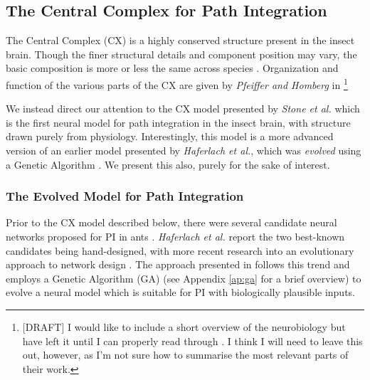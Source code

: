\documentclass[a4paper,11pt,twoside,openright]{article}
\begin{document}
\subsection{ The Central Complex for Path Integration } \label{CXBackground}
The Central Complex (CX) is a highly conserved structure present in the insect
brain\cite{Pfeiffer2014, Stone2017}. Though the finer structural details and
component position may vary, the basic composition is more or less the same
across species \cite{Pfeiffer2014}. Organization and function of the
various parts of the CX are given by \textit{Pfeiffer and Homberg} in
\cite{Pfeiffer2014}\footnote{[DRAFT] I would like to include a short overview
  of the neurobiology but have left it until I can properly read through
  \cite{Pfeiffer2014}. I think I will need to leave this out, however, as I'm
  not sure how to summarise the most relevant parts of their work.
}
\newline
\par

We instead direct our attention to the CX model presented by
\textit{Stone et al.} which is the first neural model for path integration
in the insect brain, with structure drawn purely from physiology. Interestingly,
this model is a more advanced version of an earlier model presented by
\textit{Haferlach et al.}, which was \textit{evolved} using a Genetic Algorithm
\cite{Haferlach2007}. We present this also, purely for the sake of interest.

\subsubsection{The Evolved Model for Path Integration}
Prior to the CX model described below, there were several candidate neural
networks proposed for PI in ants \cite{Haferlach2007}. \textit{Haferlach et al.}
report the
two best-known candidates being hand-designed, with more recent research
into an evolutionary approach to network design \cite{Haferlach2007}. The
approach presented in \cite{Haferlach2007} follows this trend and employs
a Genetic Algorithm (GA) (see Appendix \ref{ap:ga} for a brief overview) to
evolve a neural model which is suitable for PI with biologically plausible
inputs.
\newline
\par
\end{document}
